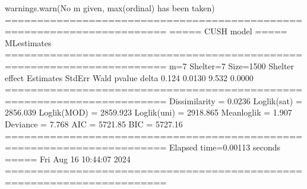 \documentclass[letterpaper,10pt,english]{sphinxmanual}
\begin{document}
\begin{sphinxVerbatim}[commandchars=\\\{\}]
warnings.warn(\PYGZdq{}No m given, max(ordinal) has been taken\PYGZdq{})
=======================================================================
=====\PYGZgt{}\PYGZgt{}\PYGZgt{} CUSH model \PYGZlt{}\PYGZlt{}\PYGZlt{}===== ML\PYGZhy{}estimates
=======================================================================
m=7  Shelter=7  Size=1500
\PYGZhy{}\PYGZhy{}\PYGZhy{}\PYGZhy{}\PYGZhy{}\PYGZhy{}\PYGZhy{}\PYGZhy{}\PYGZhy{}\PYGZhy{}\PYGZhy{}\PYGZhy{}\PYGZhy{}\PYGZhy{}\PYGZhy{}\PYGZhy{}\PYGZhy{}\PYGZhy{}\PYGZhy{}\PYGZhy{}\PYGZhy{}\PYGZhy{}\PYGZhy{}\PYGZhy{}\PYGZhy{}\PYGZhy{}\PYGZhy{}\PYGZhy{}\PYGZhy{}\PYGZhy{}\PYGZhy{}\PYGZhy{}\PYGZhy{}\PYGZhy{}\PYGZhy{}\PYGZhy{}\PYGZhy{}\PYGZhy{}\PYGZhy{}\PYGZhy{}\PYGZhy{}\PYGZhy{}\PYGZhy{}\PYGZhy{}\PYGZhy{}\PYGZhy{}\PYGZhy{}\PYGZhy{}\PYGZhy{}\PYGZhy{}\PYGZhy{}\PYGZhy{}\PYGZhy{}\PYGZhy{}\PYGZhy{}\PYGZhy{}\PYGZhy{}\PYGZhy{}\PYGZhy{}\PYGZhy{}\PYGZhy{}\PYGZhy{}\PYGZhy{}\PYGZhy{}\PYGZhy{}\PYGZhy{}\PYGZhy{}\PYGZhy{}\PYGZhy{}\PYGZhy{}\PYGZhy{}
Shelter effect
       Estimates  StdErr   Wald  p\PYGZhy{}value
delta      0.124  0.0130  9.532   0.0000
=======================================================================
Dissimilarity = 0.0236
Loglik(sat)   = \PYGZhy{}2856.039
Loglik(MOD)   = \PYGZhy{}2859.923
Loglik(uni)   = \PYGZhy{}2918.865
Mean\PYGZhy{}loglik   = \PYGZhy{}1.907
Deviance      = 7.768
\PYGZhy{}\PYGZhy{}\PYGZhy{}\PYGZhy{}\PYGZhy{}\PYGZhy{}\PYGZhy{}\PYGZhy{}\PYGZhy{}\PYGZhy{}\PYGZhy{}\PYGZhy{}\PYGZhy{}\PYGZhy{}\PYGZhy{}\PYGZhy{}\PYGZhy{}\PYGZhy{}\PYGZhy{}\PYGZhy{}\PYGZhy{}\PYGZhy{}\PYGZhy{}\PYGZhy{}\PYGZhy{}\PYGZhy{}\PYGZhy{}\PYGZhy{}\PYGZhy{}\PYGZhy{}\PYGZhy{}\PYGZhy{}\PYGZhy{}\PYGZhy{}\PYGZhy{}\PYGZhy{}\PYGZhy{}\PYGZhy{}\PYGZhy{}\PYGZhy{}\PYGZhy{}\PYGZhy{}\PYGZhy{}\PYGZhy{}\PYGZhy{}\PYGZhy{}\PYGZhy{}\PYGZhy{}\PYGZhy{}\PYGZhy{}\PYGZhy{}\PYGZhy{}\PYGZhy{}\PYGZhy{}\PYGZhy{}\PYGZhy{}\PYGZhy{}\PYGZhy{}\PYGZhy{}\PYGZhy{}\PYGZhy{}\PYGZhy{}\PYGZhy{}\PYGZhy{}\PYGZhy{}\PYGZhy{}\PYGZhy{}\PYGZhy{}\PYGZhy{}\PYGZhy{}\PYGZhy{}
AIC = 5721.85
BIC = 5727.16
=======================================================================
Elapsed time=0.00113 seconds =====\PYGZgt{}\PYGZgt{}\PYGZgt{} Fri Aug 16 10:44:07 2024
=======================================================================
\end{sphinxVerbatim}

\noindent{}
\end{document}
